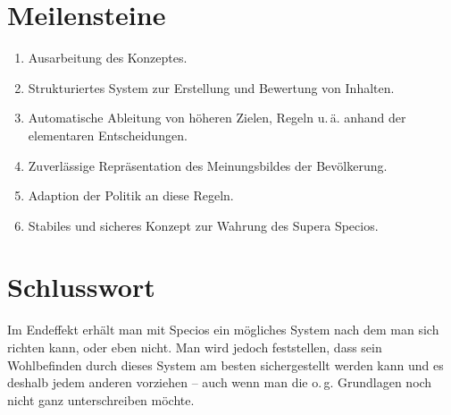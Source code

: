 \section{Meilensteine}\label{sec:milestones}

\begin{enumerate}[1.]
\item Ausarbeitung des Konzeptes.
\item Strukturiertes System zur Erstellung und Bewertung von Inhalten.
\item Automatische Ableitung von höheren Zielen, Regeln u.\,ä. anhand der elementaren Entscheidungen.
\item Zuverlässige Repräsentation des Meinungsbildes der Bevölkerung.
\item Adaption der Politik an diese Regeln.
\item Stabiles und sicheres Konzept zur Wahrung des Supera Specios.
\end{enumerate}

\section{Schlusswort}\label{sec:conclusion}

Im Endeffekt erhält man mit Specios ein mögliches System nach dem man sich richten kann, oder eben nicht. Man wird jedoch feststellen, dass sein Wohlbefinden durch dieses System am besten sichergestellt werden kann und es deshalb jedem anderen vorziehen -- auch wenn man die o.\,g. Grundlagen noch nicht ganz unterschreiben möchte.
